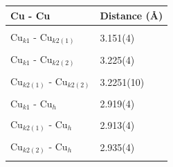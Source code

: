 \documentclass[
sn-mathphys,
Numbered,
onecolumn]
{sn-jnl}%
\begin{document}
\begin{table}[b]
    \centering
    \begin{tabular}{l l l} \hline \hline
     \multicolumn{2}{l}{Cu - Cu}  &  Distance (\AA) \\ \hline \\[-1em] 
     \multicolumn{2}{l}{Cu$_{k1}$ - Cu$_{{k2}(1)}$} & 3.151(4) \\ \\[-1em] 
     \multicolumn{2}{l}{Cu$_{k1}$ - Cu$_{{k2}(2)}$} & 3.225(4) \\ \\[-1em] 
     \multicolumn{2}{l}{Cu$_{{k2}(1)}$ - Cu$_{{k2}(2)}$} & 3.2251(10) \\ \\[-1em]
     \multicolumn{2}{l}{Cu$_{k1}$ - Cu$_h$} & 2.919(4) \\ \\[-1em] 
     \multicolumn{2}{l}{Cu$_{{k2}(1)}$ - Cu$_h$} & 2.913(4) \\ \\[-1em]
     \multicolumn{2}{l}{Cu$_{{k2}(2)}$ - Cu$_h$} & 2.935(4) \\ \\[-1em] 
  

\end{tabular}
\end{table}
\end{document}
